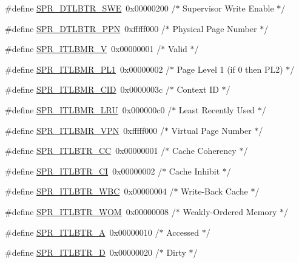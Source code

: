 \begin{DoxyCompactItemize}
\item 
\#define \hyperlink{spr-defs_8h_af1e44b2ff9c622c9041b7360e6542221}{\-S\-P\-R\-\_\-\-D\-T\-L\-B\-T\-R\-\_\-\-S\-W\-E}~0x00000200  /$\ast$ Supervisor Write Enable $\ast$/
\item 
\#define \hyperlink{spr-defs_8h_aac3af042e3b97f897ec13cbc67e31590}{\-S\-P\-R\-\_\-\-D\-T\-L\-B\-T\-R\-\_\-\-P\-P\-N}~0xfffff000  /$\ast$ Physical Page Number $\ast$/
\item 
\#define \hyperlink{spr-defs_8h_ad2608a7f5c61c8a13fa79116f878c409}{\-S\-P\-R\-\_\-\-I\-T\-L\-B\-M\-R\-\_\-\-V}~0x00000001  /$\ast$ Valid $\ast$/
\item 
\#define \hyperlink{spr-defs_8h_a27534f9e46131a76dc84badd7ee947b3}{\-S\-P\-R\-\_\-\-I\-T\-L\-B\-M\-R\-\_\-\-P\-L1}~0x00000002  /$\ast$ Page Level 1 (if 0 then P\-L2) $\ast$/
\item 
\#define \hyperlink{spr-defs_8h_a232d4941f6cf24d68f7af1a4e4311b35}{\-S\-P\-R\-\_\-\-I\-T\-L\-B\-M\-R\-\_\-\-C\-I\-D}~0x0000003c  /$\ast$ Context I\-D $\ast$/
\item 
\#define \hyperlink{spr-defs_8h_a215a96f656f2d5509a808ffc0b47579c}{\-S\-P\-R\-\_\-\-I\-T\-L\-B\-M\-R\-\_\-\-L\-R\-U}~0x000000c0  /$\ast$ Least Recently Used $\ast$/
\item 
\#define \hyperlink{spr-defs_8h_a43d866dd1ccbc82177e73f86fb70481a}{\-S\-P\-R\-\_\-\-I\-T\-L\-B\-M\-R\-\_\-\-V\-P\-N}~0xfffff000  /$\ast$ Virtual Page Number $\ast$/
\item 
\#define \hyperlink{spr-defs_8h_a2da3f3b0787789cbc544a81c89875fce}{\-S\-P\-R\-\_\-\-I\-T\-L\-B\-T\-R\-\_\-\-C\-C}~0x00000001  /$\ast$ Cache Coherency $\ast$/
\item 
\#define \hyperlink{spr-defs_8h_a72e0e1988d94f418f820aa653acf7524}{\-S\-P\-R\-\_\-\-I\-T\-L\-B\-T\-R\-\_\-\-C\-I}~0x00000002  /$\ast$ Cache Inhibit $\ast$/
\item 
\#define \hyperlink{spr-defs_8h_ae280c097ea6d6d49b514f0fa3c62bee8}{\-S\-P\-R\-\_\-\-I\-T\-L\-B\-T\-R\-\_\-\-W\-B\-C}~0x00000004  /$\ast$ Write-\/\-Back Cache $\ast$/
\item 
\#define \hyperlink{spr-defs_8h_a7cb028e5f4a09a03dc8d74c6214a41ed}{\-S\-P\-R\-\_\-\-I\-T\-L\-B\-T\-R\-\_\-\-W\-O\-M}~0x00000008  /$\ast$ Weakly-\/\-Ordered Memory $\ast$/
\item 
\#define \hyperlink{spr-defs_8h_ac83f849d7ecb7e37f934d1fb36ab654e}{\-S\-P\-R\-\_\-\-I\-T\-L\-B\-T\-R\-\_\-\-A}~0x00000010  /$\ast$ Accessed $\ast$/
\item 
\#define \hyperlink{spr-defs_8h_a09f7068fe801f8df3a5e55be8a0fdb8a}{\-S\-P\-R\-\_\-\-I\-T\-L\-B\-T\-R\-\_\-\-D}~0x00000020  /$\ast$ Dirty $\ast$/

\end{DoxyCompactItemize}
